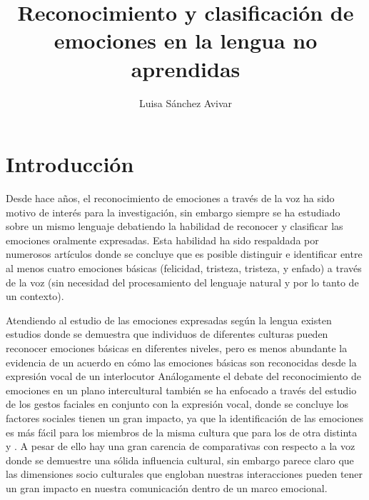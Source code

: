 \documentclass[11pt,a4paper,spanish]{book}
\begin{document}
	\title{Reconocimiento y clasificación de emociones en la lengua no aprendidas}
	\author{Luisa Sánchez Avivar}
	
	
	
	\mainmatter
	\chapter{Introducción}
	Desde hace años, el reconocimiento de emociones a través de la voz ha sido motivo de interés para la investigación, sin embargo siempre se ha estudiado sobre un mismo lenguaje debatiendo la habilidad de reconocer y clasificar las emociones oralmente expresadas. Esta habilidad ha sido respaldada por numerosos artículos donde se concluye que es posible distinguir e identificar entre al menos cuatro emociones básicas (felicidad, tristeza, tristeza, y enfado) a través de la voz (sin necesidad del procesamiento del lenguaje natural y por lo tanto de un contexto).
	
	Atendiendo al estudio de las emociones expresadas según la lengua existen estudios donde se demuestra que individuos de diferentes culturas pueden reconocer emociones básicas en diferentes niveles, pero es menos abundante la evidencia de un acuerdo en cómo las emociones básicas son reconocidas desde la expresión vocal de un interlocutor \cite{Pell2009a}
	Análogamente el debate del reconocimiento de emociones en un plano intercultural también se ha enfocado a través del estudio de los gestos faciales en conjunto con la expresión vocal, donde se concluye los factores sociales tienen un gran impacto, ya que la identificación de las emociones es más fácil para los miembros de la misma cultura que para los de otra distinta \cite{Pell2009a} y \cite{Pell2009}. A pesar de ello hay una gran carencia de comparativas con respecto a la voz donde se demuestre una sólida influencia cultural, sin embargo parece claro que las dimensiones socio culturales que engloban nuestras interacciones pueden tener un gran impacto en nuestra comunicación dentro de un marco emocional.
	
\end{document}
